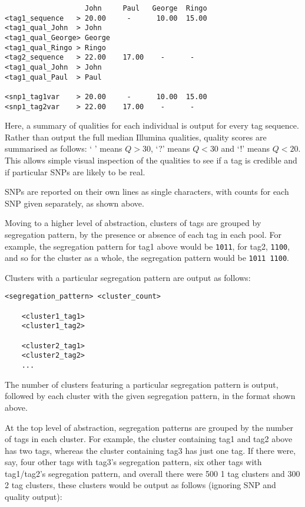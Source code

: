 \documentclass[a4paper]{article}
\begin{document}
\begin{verbatim}
                   John     Paul   George  Ringo
<tag1_sequence   > 20.00     -      10.00  15.00
<tag1_qual_John  > John
<tag1_qual_George> George
<tag1_qual_Ringo > Ringo
<tag2_sequence   > 22.00    17.00    -      -
<tag1_qual_John  > John
<tag1_qual_Paul  > Paul

<snp1_tag1var    > 20.00     -      10.00  15.00
<snp1_tag2var    > 22.00    17.00    -      -
\end{verbatim}

Here, a summary of qualities for each individual is output for every tag sequence. Rather than output the full median Illumina qualities, quality scores are summarised as follows: ` ' means $Q>30$, `?' means $Q<30$ and `!' means $Q<20$. This allows simple visual inspection of the qualities to see if a tag is credible and if particular SNPs are likely to be real.

SNPs are reported on their own lines as single characters, with counts for each SNP given separately, as shown above.

Moving to a higher level of abstraction, clusters of tags are grouped by segregation pattern, by the presence or absence of each tag in each pool. For example, the segregation pattern for tag1 above would be \verb|1011|, for tag2, \verb|1100|, and so for the cluster as a whole, the segregation pattern would be \verb|1011 1100|.

Clusters with a particular segregation pattern are output as follows:

\begin{verbatim}
<segregation_pattern> <cluster_count>
    
    <cluster1_tag1>
    <cluster1_tag2>
    
    <cluster2_tag1>
    <cluster2_tag2>
    ...
\end{verbatim}
The number of clusters featuring a particular segregation pattern is output, followed by each cluster with the given segregation pattern, in the format shown above.

At the top level of abstraction, segregation patterns are grouped by the number of tags in each cluster. For example, the cluster containing tag1 and tag2 above has two tags, whereas the cluster containing tag3 has just one tag. If there were, say, four other tags with tag3's segregation pattern, six other tags with tag1/tag2's segregation pattern, and overall there were 500 1 tag clusters and 300 2 tag clusters, these clusters would be output as follows (ignoring SNP and quality output):
\end{document}
